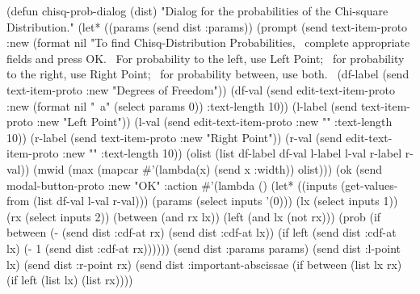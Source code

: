 \nwenddocs{}\plusendmoddef
(defun chisq-prob-dialog (dist)
  "Dialog for the probabilities of the Chi-square Distribution."
  (let* ((params (send dist :params))
         (prompt (send text-item-proto :new
                  (format nil 
                    "To find Chisq-Distribution Probabilities,~%
                     complete appropriate fields and press OK.~%
                     For probability to the left, use Left Point;~%
                     for probability to the right, use Right Point;~%
                     for probability between, use both.~%
         (df-label (send text-item-proto :new "Degrees of Freedom"))
         (df-val (send edit-text-item-proto :new
                       (format nil "~a" (select params 0)) :text-length 10))
         (l-label (send text-item-proto :new "Left Point"))
         (l-val (send edit-text-item-proto :new "" :text-length 10))
         (r-label (send text-item-proto :new "Right Point"))
         (r-val (send edit-text-item-proto :new "" :text-length 10))
         (olist (list df-label df-val l-label l-val r-label r-val))
         (mwid (max (mapcar #'(lambda(x) (send x :width)) olist)))
         (ok (send modal-button-proto :new "OK"
                   :action
                   #'(lambda ()
                      (let* ((inputs (get-values-from 
                                      (list df-val l-val r-val)))
                             (params (select inputs '(0)))
                             (lx (select inputs 1))
                             (rx (select inputs 2))
                             (between (and rx lx))
                             (left (and lx (not rx)))
                             (prob (if between
                                      (- (send dist :cdf-at rx)
                                         (send dist :cdf-at lx))
                                     (if left
                                        (send dist :cdf-at lx)
                                       (- 1 (send dist :cdf-at rx))))))
                         (send dist :params params)
                         (send dist :l-point lx)
                         (send dist :r-point rx)
                         (send dist :important-abscissae
                               (if between
                                   (list lx rx)
                                 (if left
                                     (list lx)
                                   (list rx))))
